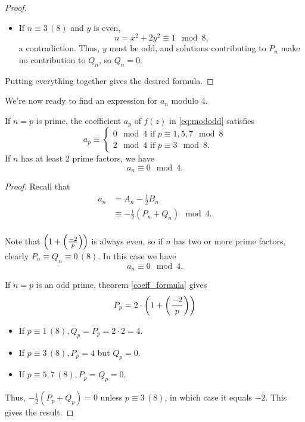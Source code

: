 \documentclass[12pt, a4paper]{report}
\begin{document}
\begin{proof}
\begin{itemize}
  \item If $n \equiv 3 \, (8)$ and $y$ is even,
    \[n = x^2 + 2y^2 \equiv 1 \mod{8},\] a contradiction. Thus, $y$ must be odd,
    and solutions contributing to $P_n$ make no contribution to $Q_n$, so $Q_n =
    0$.
  \end{itemize}
  Putting everything together gives the desired formula.

\end{proof}

We're now ready to find an expression for $a_n$ modulo 4. 

\begin{thm}
  If $n = p$ is prime, the coefficient $a_p$ of $f(z)$ in \autoref{eq:mododd}
  satisfies
  \[a_p \equiv \begin{cases}
      0 \mod{4} \text{ if } p \equiv 1,5,7 \mod{8} \\
      2 \mod{4} \text{ if } p \equiv 3 \mod{8}.
    \end{cases}\]
  If $n$ has at least 2 prime factors, we have
  \[a_n \equiv 0 \mod{4}.\]
\end{thm}
\begin{proof}
  Recall that
  \[
    \begin{split}
      a_n &= A_n - \frac{1}{2}B_n \\
      &\equiv -\frac{1}{2}(P_n + Q_n) \mod{4}. \\
    \end{split}
  \]

  Note that $\left( 1 + \left(\frac{-2}{p}\right) \right)$ is always even, so
  if $n$ has two or more prime factors, clearly $P_n \equiv Q_n \equiv 0 \,(8)$.
  In this case we have
  \[a_n\equiv 0 \mod{4}.\]

  If $n = p$ is an odd prime, theorem \autoref{coeff_formula} gives
  \[P_p = 2 \cdot \left( 1 + \left(\frac{-2}{p}\right) \right)\]
  \begin{itemize}
  \item If $p \equiv 1 \, (8), Q_p = P_p = 2 \cdot 2 = 4$.

  \item If $p \equiv 3 \, (8), P_p = 4$ but $Q_p = 0$.

  \item If $p \equiv 5, 7 \, (8), P_p = Q_p = 0$.
  \end{itemize}
  Thus, $-\frac{1}{2} (P_p + Q_p) = 0$ unless $p \equiv 3 \, (8)$, in which case
  it equals $-2$. This gives the result.

\end{proof}
\end{document}
